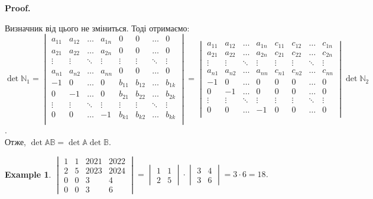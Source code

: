 \documentclass[a4paper, 10pt]{article}
\makeatletter
\theoremstyle{theoremdd}
\newtheorem{example}[theorem]{Example}
\renewenvironment{proof}[1][Proof.\\]{\par
\pushQED{\hfill \qed}%
\normalfont \topsep6\p@\@plus6\p@\relax
\trivlist
\item\relax
{\bfseries
#1\@addpunct{.}}\hspace\labelsep\ignorespaces
}{%
\popQED\endtrivlist\@endpefalse
}
\makeatother
\begin{document}
\begin{proof}
Визначник від цього не зміниться. Тоді отримаємо:\\
$\det \mathbb{N}_1 = \begin{vmatrix}
a_{11} & a_{12} & \dots & a_{1n} & 0 & 0 & \dots & 0 \\
a_{21} & a_{22} & \dots & a_{2n} & 0 & 0 & \dots & 0 \\
\vdots & \vdots & \ddots & \vdots & \vdots & \vdots & \ddots & \vdots \\
a_{n1} & a_{n2} & \dots & a_{nn} & 0 & 0 & \dots & 0 \\
-1 & 0 & \dots & 0 & b_{11} & b_{12} & \dots & b_{1k} \\
0 & -1 & \dots & 0 & b_{21} & b_{22} & \dots & b_{2k} \\
\vdots & \vdots & \ddots & \vdots & \vdots & \vdots & \ddots & \vdots \\
0 & 0 & \dots & -1 & b_{k1} & b_{k2} & \dots & b_{kk} \\
\end{vmatrix} = \begin{vmatrix}
a_{11} & a_{12} & \dots & a_{1n} & c_{11} & c_{12} & \dots & c_{1n} \\
a_{21} & a_{22} & \dots & a_{2n} & c_{21} & c_{22} & \dots & c_{2n} \\
\vdots & \vdots & \ddots & \vdots & \vdots & \vdots & \ddots & \vdots \\
a_{n1} & a_{n2} & \dots & a_{nn} & c_{n1} & c_{n2} & \dots & c_{nn} \\
-1 & 0 & \dots & 0 & 0 & 0 & \dots & 0 \\
0 & -1 & \dots & 0 & 0 & 0 & \dots & 0 \\
\vdots & \vdots & \ddots & \vdots & \vdots & \vdots & \ddots & \vdots \\
0 & 0 & \dots & -1 & 0 & 0 & \dots & 0 \\
\end{vmatrix} \det \mathbb{N}_2$.\\
Отже, $\det \mathbb{A} \mathbb{B} = \det \mathbb{A} \det \mathbb{B}$.
\end{proof}

\begin{example}
$\begin{vmatrix}
1 & 1 & 2021 & 2022 \\
2 & 5 & 2023 & 2024 \\
0 & 0 & 3 & 4 \\
0 & 0 & 3 & 6
\end{vmatrix} = \begin{vmatrix}
1 & 1 \\
2 & 5
\end{vmatrix} \cdot \begin{vmatrix}
3 & 4 \\
3 & 6
\end{vmatrix} = 3 \cdot 6 = 18$.
\end{example}
\end{document}
